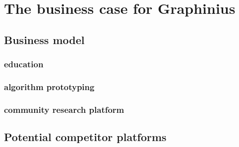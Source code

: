 \chapter{The business case for Graphinius}
\label{ch:business_case}


\section{Business model}
\label{sect:business_model}

	\subsection{education}
	\label{ssect:education}
	
	\subsection{algorithm prototyping}
	\label{ssect:algo_proto}
	
	\subsection{community research platform}
	\label{ssect:research}


\section{Potential competitor platforms}
\label{sect:potential_competitors}
